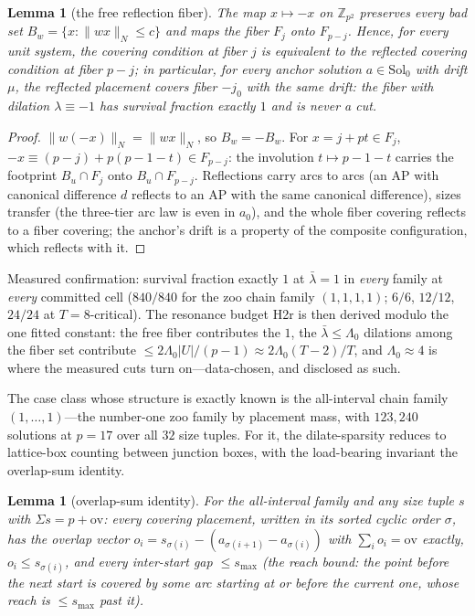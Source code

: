\documentclass[11pt,a4paper]{article}
\numberwithin{equation}{section}
\theoremstyle{plain}
\newtheorem{lemma}[theorem]{Lemma}
\theoremstyle{definition}
\theoremstyle{remark}
\newcommand{\Z}{\mathbb{Z}}
\newcommand{\wn}[1]{\lVert #1 \rVert_{N}}
\begin{document}
\begin{lemma}[the free reflection fiber]\label{lem:reflect}
The map $x\mapsto-x$ on $\Z_{p^2}$ preserves every bad set
$B_w=\{x:\wn{wx}\le c\}$ and maps the fiber $F_j$ onto $F_{p-j}$. Hence,
for every unit system, the covering condition at fiber $j$ is
equivalent to the reflected covering condition at fiber $p-j$; in
particular, for every anchor solution $a\in\mathrm{Sol}_0$ with drift
$\mu$, the reflected placement covers fiber $-j_0$ with the same drift:
the fiber with dilation $\lambda\equiv-1$ has survival fraction exactly
$1$ and is never a cut.
\end{lemma}

\begin{proof}
$\wn{w(-x)}=\wn{wx}$, so $B_w=-B_w$. For $x=j+pt\in F_j$,
$-x\equiv(p-j)+p(p-1-t)\in F_{p-j}$: the involution
$t\mapsto p-1-t$ carries the footprint $B_u\cap F_j$ onto
$B_u\cap F_{p-j}$. Reflections carry arcs to arcs (an AP with canonical
difference $d$ reflects to an AP with the same canonical difference),
sizes transfer (the three-tier arc law is even in $a_0$), and the whole
fiber covering reflects to a fiber covering; the anchor's drift is a
property of the composite configuration, which reflects with it.
\end{proof}

Measured confirmation: survival fraction exactly $1$ at
$\bar\lambda=1$ in \emph{every} family at \emph{every} committed cell
($840/840$ for the zoo chain family $(1,1,1,1)$; $6/6$, $12/12$,
$24/24$ at $T=8$-critical). The resonance budget H2r is then derived
modulo the one fitted constant: the free fiber contributes the $1$, the
$\bar\lambda\le\Lambda_0$ dilations among the fiber set contribute
$\le 2\Lambda_0|U|/(p-1)\approx2\Lambda_0(T-2)/T$, and $\Lambda_0\approx4$
is where the measured cuts turn on---data-chosen, and disclosed as
such.

The case class whose structure is exactly known is the all-interval
chain family $(1,\dots,1)$---the number-one zoo family by placement
mass, with $123{,}240$ solutions at $p=17$ over all $32$ size tuples.
For it, the dilate-sparsity reduces to lattice-box counting between
junction boxes, with the load-bearing invariant the overlap-sum
identity.

\begin{lemma}[overlap-sum identity]\label{lem:overlapsum}
For the all-interval family and any size tuple $s$ with
$\Sigma s=p+\mathrm{ov}$: every covering placement, written in its
sorted cyclic order $\sigma$, has the overlap vector
$o_i=s_{\sigma(i)}-(a_{\sigma(i+1)}-a_{\sigma(i)})$ with
$\sum_i o_i=\mathrm{ov}$ exactly, $o_i\le s_{\sigma(i)}$, and every
inter-start gap $\le s_{\max}$ (the reach bound: the point before the
next start is covered by some arc starting at or before the current
one, whose reach is $\le s_{\max}$ past it).
\end{lemma}
\end{document}
